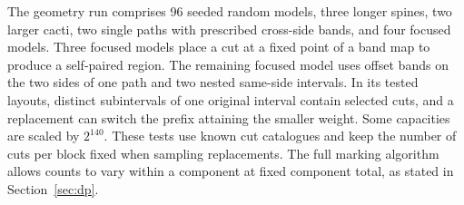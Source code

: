 \documentclass[10pt,letterpaper]{article}
\begin{document}
The geometry run comprises 96 seeded random models, three longer spines, two larger cacti, two single paths with prescribed cross-side bands, and four focused models. Three focused models place a cut at a fixed point of a band map to produce a self-paired region. The remaining focused model uses offset bands on the two sides of one path and two nested same-side intervals. In its tested layouts, distinct subintervals of one original interval contain selected cuts, and a replacement can switch the prefix attaining the smaller weight. Some capacities are scaled by \(2^{140}\). These tests use known cut catalogues and keep the number of cuts per block fixed when sampling replacements. The full marking algorithm allows counts to vary within a component at fixed component total, as stated in Section~\ref{sec:dp}.
\end{document}
